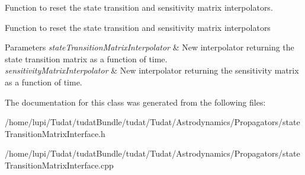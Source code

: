 Function to reset the state transition and sensitivity matrix interpolators. 

Function to reset the state transition and sensitivity matrix interpolators 
\begin{DoxyParams}{Parameters}
{\em state\+Transition\+Matrix\+Interpolator} & New interpolator returning the state transition matrix as a function of time. \\
\hline
{\em sensitivity\+Matrix\+Interpolator} & New interpolator returning the sensitivity matrix as a function of time. \\
\hline
\end{DoxyParams}


The documentation for this class was generated from the following files\+:\begin{DoxyCompactItemize}
\item 
/home/lupi/\+Tudat/tudat\+Bundle/tudat/\+Tudat/\+Astrodynamics/\+Propagators/state\+Transition\+Matrix\+Interface.\+h\item 
/home/lupi/\+Tudat/tudat\+Bundle/tudat/\+Tudat/\+Astrodynamics/\+Propagators/state\+Transition\+Matrix\+Interface.\+cpp\end{DoxyCompactItemize}
